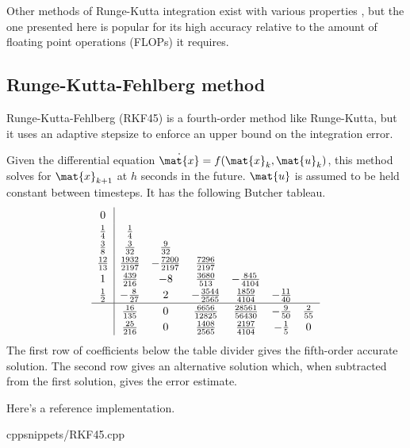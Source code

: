 Other methods of Runge-Kutta integration exist with various properties
\cite{bib:wiki_rk4}, but the one presented here is popular for its high accuracy
relative to the amount of floating point operations (FLOPs) it requires.

\subsection{Runge-Kutta-Fehlberg method}

Runge-Kutta-Fehlberg (RKF45) is a fourth-order method like Runge-Kutta, but it
uses an adaptive stepsize to enforce an upper bound on the integration error.
\begin{theorem}
  Given the differential equation $\dot{\mat{x}} = f(\mat{x}_k, \mat{u}_k)$,
  this method solves for $\mat{x}_{k+1}$ at $h$ seconds in the future.
  $\mat{u}$ is assumed to be held constant between timesteps. It has the
  following Butcher tableau.
  \begin{equation*}
    \renewcommand\arraystretch{1.2}
    \begin{array}{c|ccccccc}
      0 \\
      \frac{1}{4} & \frac{1}{4} \\
      \frac{3}{8} & \frac{3}{32} & \frac{9}{32} \\
      \frac{12}{13} & \frac{1932}{2197} & -\frac{7200}{2197} & \frac{7296}{2197}
        \\
      1 & \frac{439}{216} & -8 & \frac{3680}{513} & -\frac{845}{4104} \\
      \frac{1}{2} & -\frac{8}{27} & 2 & -\frac{3544}{2565} & \frac{1859}{4104} &
        -\frac{11}{40} \\
      \hline
      & \frac{16}{135} & 0 & \frac{6656}{12825} & \frac{28561}{56430} &
        -\frac{9}{50} & \frac{2}{55} \\
      & \frac{25}{216} & 0 & \frac{1408}{2565} & \frac{2197}{4104} &
        -\frac{1}{5} & 0
    \end{array}
  \end{equation*}
  The first row of coefficients below the table divider gives the fifth-order
  accurate solution. The second row gives an alternative solution which,
  when subtracted from the first solution, gives the error estimate.
\end{theorem}

Here's a reference implementation.
\begin{coderemote}{cpp}{snippets/RKF45.cpp}
  \caption{RKF45 implementation in C++}
\end{coderemote}

